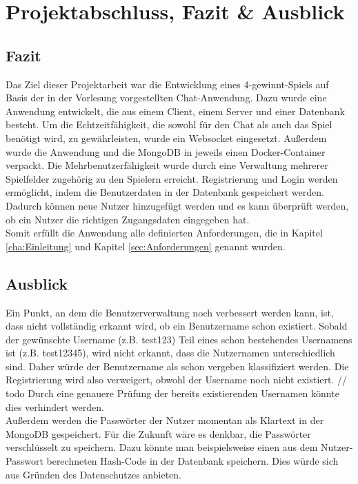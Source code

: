 
\chapter{Projektabschluss, Fazit \& Ausblick}\label{cha:Schlussbetrachtung}
\section{Fazit}\label{sec:Fazit}
Das Ziel dieser Projektarbeit war die Entwicklung eines 4-gewinnt-Spiels auf Basis der in der Vorlesung vorgestellten Chat-Anwendung. Dazu wurde eine Anwendung entwickelt, die aus einem Client, einem Server und einer Datenbank besteht. Um die Echtzeitfähigkeit, die sowohl für den Chat als auch das Spiel benötigt wird, zu gewährleisten, wurde ein Websocket eingesetzt. Außerdem wurde die Anwendung und die MongoDB in jeweils einen Docker-Container verpackt. Die Mehrbenutzerfähigkeit wurde durch eine Verwaltung mehrerer Spielfelder zugehörig zu den Spielern erreicht. Registrierung und Login werden ermöglicht, indem die Benutzerdaten in der Datenbank gespeichert werden. Dadurch können neue Nutzer hinzugefügt werden und es kann überprüft werden, ob ein Nutzer die richtigen Zugangsdaten eingegeben hat.\\
Somit erfüllt die Anwendung alle definierten Anforderungen, die in Kapitel \ref{cha:Einleitung} und Kapitel \ref{sec:Anforderungen} genannt wurden.

\section{Ausblick}\label{sec:Ausblick}
Ein Punkt, an dem die Benutzerverwaltung noch verbessert werden kann, ist, dass nicht vollständig erkannt wird, ob ein Benutzername schon existiert. Sobald der gewünschte Username (z.B. test123) Teil eines schon bestehendes Usernamens ist (z.B. test12345), wird nicht erkannt, dass die Nutzernamen unterschiedlich sind. Daher würde der Benutzername als schon vergeben klassifiziert werden. Die Registrierung wird also verweigert, obwohl der Username noch nicht existiert. // todo Durch eine genauere Prüfung der bereits existierenden Usernamen könnte dies verhindert werden.\\
Außerdem werden die Passwörter der Nutzer momentan als Klartext in der MongoDB gespeichert. Für die Zukunft wäre es denkbar, die Passwörter verschlüsselt zu speichern. Dazu könnte man beispielsweise einen aus dem Nutzer-Passwort berechneten Hash-Code in der Datenbank speichern. Dies würde sich aus Gründen des Datenschutzes anbieten.

